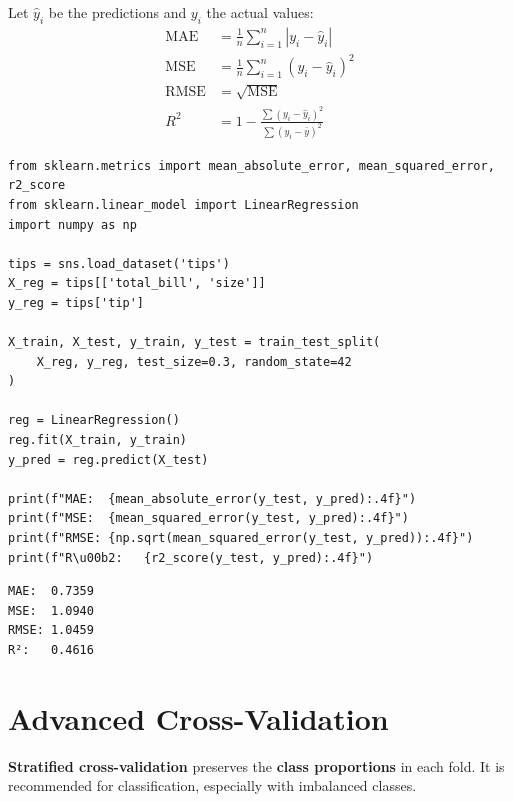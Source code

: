\begin{definition}
Let $\hat{y}_i$ be the predictions and $y_i$ the actual values:
\begin{align}
\text{MAE} &= \frac{1}{n}\sum_{i=1}^{n}|y_i - \hat{y}_i| \\[6pt]
\text{MSE} &= \frac{1}{n}\sum_{i=1}^{n}(y_i - \hat{y}_i)^2 \\[6pt]
\text{RMSE} &= \sqrt{\text{MSE}} \\[6pt]
R^2 &= 1 - \frac{\sum(y_i - \hat{y}_i)^2}{\sum(y_i - \bar{y})^2}
\end{align}
\end{definition}

\begin{codeblock}[title=\textbf{Python}]
\begin{verbatim}
from sklearn.metrics import mean_absolute_error, mean_squared_error, r2_score
from sklearn.linear_model import LinearRegression
import numpy as np

tips = sns.load_dataset('tips')
X_reg = tips[['total_bill', 'size']]
y_reg = tips['tip']

X_train, X_test, y_train, y_test = train_test_split(
    X_reg, y_reg, test_size=0.3, random_state=42
)

reg = LinearRegression()
reg.fit(X_train, y_train)
y_pred = reg.predict(X_test)

print(f"MAE:  {mean_absolute_error(y_test, y_pred):.4f}")
print(f"MSE:  {mean_squared_error(y_test, y_pred):.4f}")
print(f"RMSE: {np.sqrt(mean_squared_error(y_test, y_pred)):.4f}")
print(f"R\u00b2:   {r2_score(y_test, y_pred):.4f}")
\end{verbatim}
\end{codeblock}

\begin{codeoutput}
\begin{verbatim}
MAE:  0.7359
MSE:  1.0940
RMSE: 1.0459
R²:   0.4616
\end{verbatim}
\end{codeoutput}

\section{Advanced Cross-Validation}
\label{sec:cv_avancee}


\begin{definition}
\textbf{Stratified cross-validation} preserves the \textbf{class proportions} in each fold. It is recommended for classification, especially with imbalanced classes.
\end{definition}

